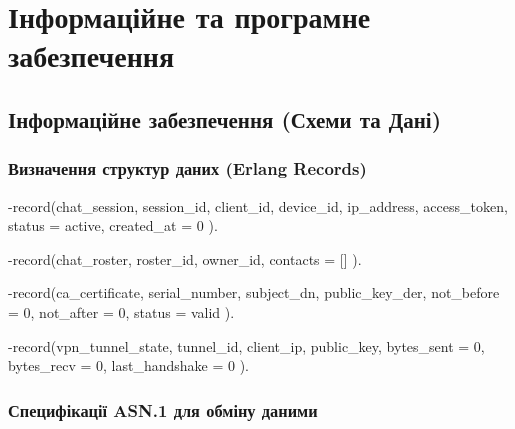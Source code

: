 \documentclass{article}
\let\originalfootnotesize\footnotesize
\let\oldverbatim\verbatim
\let\oldendverbatim\endverbatim
\renewenvironment{verbatim}{\originalfootnotesize\oldverbatim}{\oldendverbatim}
\begin{document}
\newpage
\section{Інформаційне та програмне забезпечення}

\subsection{Інформаційне забезпечення (Схеми та Дані)}

\subsubsection{Визначення структур даних (Erlang Records)}
\begin{verbatim}
-record(chat_session, {
    session_id,                 % UUID сесії (PK)
    client_id,                  % Серійний номер сертифіката X.509
    device_id,                  % Однозначний ідентифікатор пристрою
    ip_address,                 % Поточна IP-адреса
    access_token,               % Токен доступу сесії
    status = active,            % active | expired | revoked
    created_at = 0
}).

-record(chat_roster, {
    roster_id,                  % UUID ростера (PK)
    owner_id,                   % UUID власника
    contacts = []               % Список контактів
}).

-record(ca_certificate, {
    serial_number,              % Серійний номер X.509 (PK)
    subject_dn,                 % Відмітне ім'я суб'єкта
    public_key_der,             % Публічний ключ у DER кодуванні
    not_before = 0,             % Timestamp початку дії
    not_after = 0,              % Timestamp завершення дії
    status = valid              % valid | revoked | expired
}).

-record(vpn_tunnel_state, {
    tunnel_id,                  % UUID тунелю (PK)
    client_ip,                  % Виділена IP-адреса клієнта
    public_key,                 % Публічний ключ WireGuard
    bytes_sent = 0,             % Надіслано байт
    bytes_recv = 0,             % Отримано байт
    last_handshake = 0          % Timestamp останнього рукостискання
}).
\end{verbatim}

\subsubsection{Специфікації ASN.1 для обміну даними}
\end{document}
